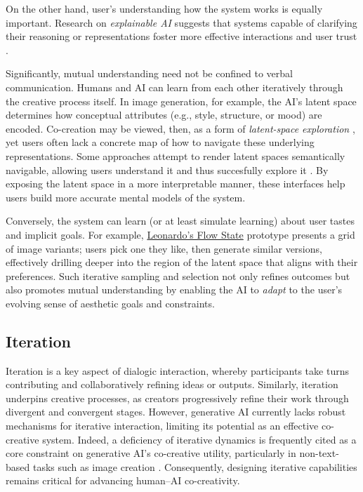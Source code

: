 On the other hand, user's understanding how the system works is equally important. Research on \textit{explainable AI} suggests that systems capable of clarifying their reasoning or representations foster more effective interactions and user trust \cite{Ribeiro2016-xb,Doshi-Velez2017-qv}.

Significantly, mutual understanding need not be confined to verbal communication. Humans and AI can learn from each other iteratively through the creative process itself. In image generation, for example, the AI’s latent space determines how conceptual attributes (e.g., style, structure, or mood) are encoded. Co-creation may be viewed, then, as a form of \textit{latent-space exploration} \cite{Loh2024-fb,Smith2022-dm}, yet users often lack a concrete map of how to navigate these underlying representations. Some approaches attempt to render latent spaces semantically navigable, allowing users understand it and thus succesfully explore it \cite{Prathyush2024-ly, Harkonen2020-eu, Davis2024-ml}. By exposing the latent space in a more interpretable manner, these interfaces help users build more accurate mental models of the system.

Conversely, the system can learn (or at least simulate learning) about user tastes and implicit goals. For example, \href{app.leonardo.ai/}{Leonardo’s Flow State} prototype presents a grid of image variants; users pick one they like, then generate similar versions, effectively drilling deeper into the region of the latent space that aligns with their preferences. Such iterative sampling and selection not only refines outcomes but also promotes mutual understanding by enabling the AI to \textit{adapt} to the user’s evolving sense of aesthetic goals and constraints.

\subsection{Iteration}

Iteration is a key aspect of dialogic interaction, whereby participants take turns contributing and collaboratively refining ideas or outputs. Similarly, iteration underpins creative processes, as creators progressively refine their work through divergent and convergent stages. However, generative AI currently lacks robust mechanisms for iterative interaction, limiting its potential as an effective co-creative system. Indeed, a deficiency of iterative dynamics is frequently cited as a core constraint on generative AI’s co-creative utility, particularly in non-text-based tasks such as image creation \cite{Park2024-gw, Ocampo2023-gu, Peng2024-tr}. Consequently, designing iterative capabilities remains critical for advancing human–AI co-creativity.

